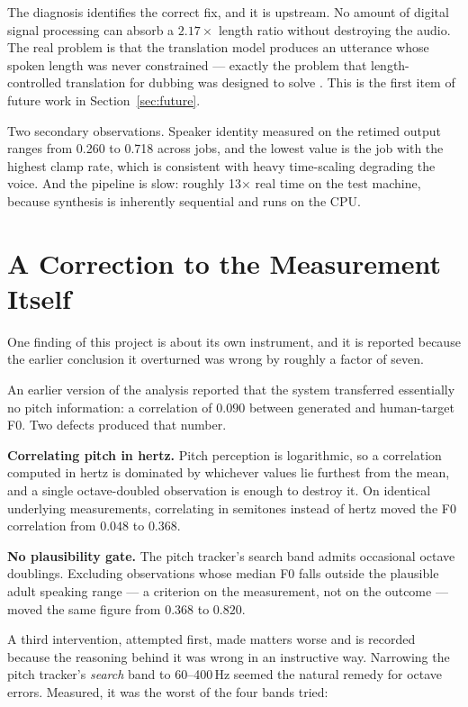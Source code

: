 The diagnosis identifies the correct fix, and it is upstream. No amount of digital signal
processing can absorb a $2.17\times$ length ratio without destroying the audio. The real problem is
that the translation model produces an utterance whose spoken length was never constrained ---
exactly the problem that length-controlled translation for dubbing was designed to solve
\cite{lakew2021verbosity,federico2020dubbing}. This is the first item of future work in
Section~\ref{sec:future}.

Two secondary observations. Speaker identity measured on the retimed output ranges from 0.260 to
0.718 across jobs, and the lowest value is the job with the highest clamp rate, which is
consistent with heavy time-scaling degrading the voice. And the pipeline is slow: roughly
13$\times$ real time on the test machine, because synthesis is inherently sequential and runs on
the CPU.

\section{A Correction to the Measurement Itself}
\label{sec:f0correction}

One finding of this project is about its own instrument, and it is reported because the earlier
conclusion it overturned was wrong by roughly a factor of seven.

An earlier version of the analysis reported that the system transferred essentially no pitch
information: a correlation of $0.090$ between generated and human-target F0. Two defects produced
that number.

\textbf{Correlating pitch in hertz.} Pitch perception is logarithmic, so a correlation computed in
hertz is dominated by whichever values lie furthest from the mean, and a single octave-doubled
observation is enough to destroy it. On identical underlying measurements, correlating in
semitones instead of hertz moved the \ento{} F0 correlation from $0.048$ to $0.368$.

\textbf{No plausibility gate.} The pitch tracker's search band admits occasional octave doublings.
Excluding observations whose median F0 falls outside the plausible adult speaking range --- a
criterion on the measurement, not on the outcome --- moved the same figure from $0.368$ to $0.820$.

A third intervention, attempted first, made matters worse and is recorded because the reasoning
behind it was wrong in an instructive way. Narrowing the pitch tracker's \emph{search} band to
60--400\,Hz seemed the natural remedy for octave errors. Measured, it was the worst of the four
bands tried:

